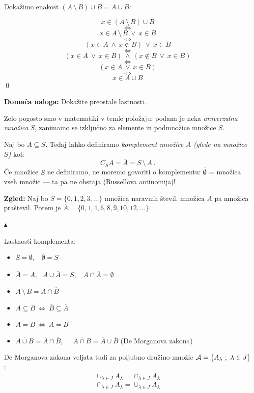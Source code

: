 \documentclass[11pt,paper=b5,footinclude,headinclude]{scrbook} %
\def\ali {{~\vee~}}
\def\inn {{~\wedge~}}
\def\brez {{\,\setminus\,}}
\def\cee {{~\Leftrightarrow~}}
\def\zgled{\noindent\textbf{\color{blue} Zgled: }}
\def\kz{{\hfill{\color{blue}$\blacktriangle$}}}%
\begin{document}
Dokažimo enakost $(A\brez B)\cup B = A\cup B$:

$$x\in (A\brez B)\cup B$$
$$\cee$$
$$x\in A\brez B \ali x\in B$$
$$\cee$$
$$(x\in A\inn x\not\in B) \ali x\in B$$
$$\cee$$
$$(x\in A\ali x\in B) \inn (x\not\in B \ali x\in B)$$
$$\cee$$
$$(x\in A\ali x\in B)$$
$$\cee$$
$$x\in A\cup B$$
\qed

\bigskip
\textbf{ Domača naloga:} Dokažite preostale lastnosti.

\bigskip



\bigskip

Zelo pogosto smo v matematiki v temle položaju: podana je neka {\em univerzalna množica} $S$, zanimamo se izključno za elemente in podmnožice množice $S$.

Naj bo $A\subseteq S$. Tedaj lahko definiramo {\em komplement množice $A$ (glede na množico $S$)} kot:
$$C_SA = \overline A = S\brez A\,.$$
Če množice $S$ ne definiramo, ne moremo govoriti o komplementu: $\overline \emptyset$ = množica vseh množic --- ta pa ne obstaja (Russellova antinomija)!

\bigskip
\zgled
Naj bo $S = \{0,1,2,3,\ldots\}$ množica naravnih števil, množica $A$ pa množica praštevil.
Potem je $\overline A = \{0,1,4,6,8,9,10,12,\ldots\}$.

\kz

\medskip

Lastnosti komplementa:
\begin{itemize}
  \item
$\overline S = \emptyset,~~~~\overline \emptyset = S$

  \item
$\overline{\overline A} = A,~~~A\cup \overline A = S,~~~~A\cap \overline A = \emptyset$

  \item
$A\brez B = A\cap \overline B$

  \item
$A\subseteq B \cee  \overline B \subseteq \overline A$

  \item
$A= B \cee  \overline A = \overline B$

  \item
$\overline{A\cup B} = \overline A\cap \overline B$,~~~$\overline{A\cap B} = \overline A\cup \overline B$ (De Morganova zakona)
\end{itemize}

De Morganova zakona veljata tudi za poljubno družino množic ${\cal A} = \{A_\lambda~;~\lambda\in J\}$:
$$\overline{\cup_{\lambda\in J}A_\lambda} = {\cap_{\lambda\in J}\overline A_\lambda}$$
$$\overline{\cap_{\lambda\in J}A_\lambda} = {\cup_{\lambda\in J}\overline A_\lambda}$$
\end{document}
